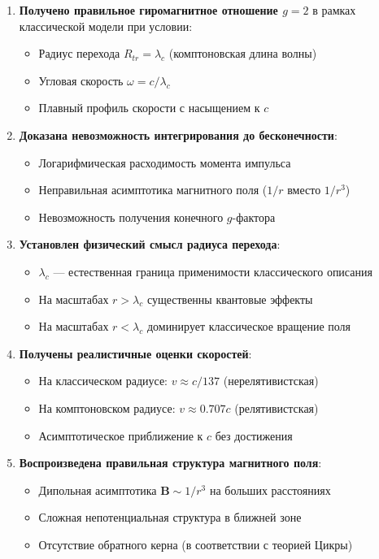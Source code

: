 \documentclass[12pt,a4paper]{article}
\begin{document}
\begin{enumerate}
    \item \textbf{Получено правильное гиромагнитное отношение $g = 2$} в рамках классической модели при условии:
    \begin{itemize}
        \item Радиус перехода $R_{tr} = \lambda_c$ (комптоновская длина волны)
        \item Угловая скорость $\omega = c/\lambda_c$
        \item Плавный профиль скорости с насыщением к $c$
    \end{itemize}

    \item \textbf{Доказана невозможность интегрирования до бесконечности}:
    \begin{itemize}
        \item Логарифмическая расходимость момента импульса
        \item Неправильная асимптотика магнитного поля ($1/r$ вместо $1/r^3$)
        \item Невозможность получения конечного $g$-фактора
    \end{itemize}

    \item \textbf{Установлен физический смысл радиуса перехода}:
    \begin{itemize}
        \item $\lambda_c$ --- естественная граница применимости классического описания
        \item На масштабах $r > \lambda_c$ существенны квантовые эффекты
        \item На масштабах $r < \lambda_c$ доминирует классическое вращение поля
    \end{itemize}

    \item \textbf{Получены реалистичные оценки скоростей}:
    \begin{itemize}
        \item На классическом радиусе: $v \approx c/137$ (нерелятивистская)
        \item На комптоновском радиусе: $v \approx 0.707c$ (релятивистская)
        \item Асимптотическое приближение к $c$ без достижения
    \end{itemize}

    \item \textbf{Воспроизведена правильная структура магнитного поля}:
    \begin{itemize}
        \item Дипольная асимптотика $\mathbf{B} \sim 1/r^3$ на больших расстояниях
        \item Сложная непотенциальная структура в ближней зоне
        \item Отсутствие обратного керна (в соответствии с теорией Цикры)
    \end{itemize}
\end{enumerate}
\end{document}

